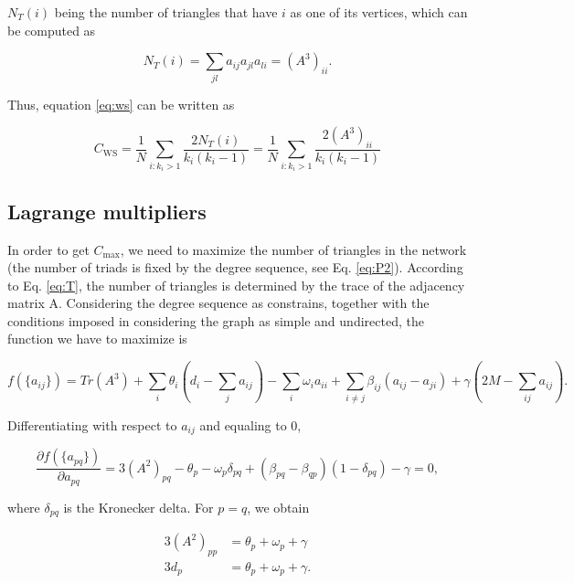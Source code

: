 \documentclass{article}
\begin{document}
$N_T(i)$ being the number of triangles that have $i$ as one of its vertices, which can be computed as

\begin{equation}
    N_T(i) = \sum_{jl} a_{ij} a_{jl} a_{li} = (A^3)_{ii}.
\end{equation}

Thus, equation \ref{eq:ws} can be written as

\begin{equation} \label{eq:CwsTheo}
    C_{\mathrm{WS}} = \dfrac{1}{N} \sum\limits_{i:k_i>1}  \dfrac{2 N_{T}(i)}{k_i (k_i-1)} =  \dfrac{1}{N} \sum\limits_{i:k_i>1} \dfrac{2 (A^3)_{ii}}{k_i (k_i-1)} 
\end{equation}


\subsection{Lagrange multipliers}

In order to get $C_{\mathrm{max}}$, we need to maximize the number of triangles in the network (the number of triads is fixed by the degree sequence, see Eq. \ref{eq:P2}). According to Eq. \ref{eq:T}, the number of triangles is determined by the trace of the adjacency matrix A. Considering the degree sequence as constrains, together with the conditions imposed in considering the graph as simple and undirected, the function we have to maximize is

\begin{equation}
    f(\lbrace a_{ij} \rbrace) = Tr(A^3) + \sum_i \theta_i \left(d_i - \sum_j a_{ij} \right) - \sum_i \omega_i a_{ii} + \sum_{i\neq j} \beta_{ij} (a_{ij}-a_{ji}) + \gamma \left(2M - \sum_{ij} a_{ij} \right).
\end{equation}

Differentiating with respect to $a_{ij}$ and equaling to 0,

\begin{equation}
    \dfrac{\partial f(\lbrace a_{pq} \rbrace)}{\partial a_{pq}} = 3 (A^2)_{pq} - \theta_p - \omega_p \delta_{pq} + (\beta_{pq} - \beta_{qp}) (1-\delta_{pq}) - \gamma = 0,
\end{equation}

where $\delta_{pq}$ is the Kronecker delta. For $p=q$, we obtain

\begin{align}
    3 (A^2)_{pp} &= \theta_p + \omega_p + \gamma \\
    3 d_p &=  \theta_p + \omega_p + \gamma.
\end{align}
\end{document}
